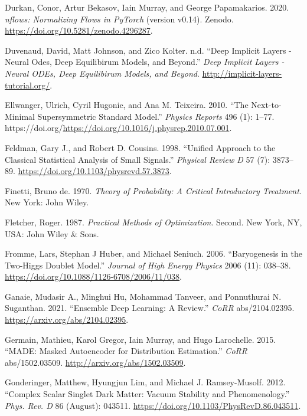 \documentclass[
  11pt,
  numbers=noendperiod]{book}
\newlength{\cslhangindent}
\newlength{\cslentryspacingunit} %
\newenvironment{CSLReferences}[2] %
 {%
  \setlength{\parindent}{0pt}
  \ifodd #1
  \let\oldpar\par
  \def\par{\hangindent=\cslhangindent\oldpar}
  \fi
  \setlength{\parskip}{#2\cslentryspacingunit}
 }%
 {}
\begin{document}
\begin{CSLReferences}{1}{0}
\leavevmode{}%
Durkan, Conor, Artur Bekasov, Iain Murray, and George Papamakarios.
2020. \emph{{nflows}: Normalizing Flows in {PyTorch}} (version v0.14).
Zenodo. \url{https://doi.org/10.5281/zenodo.4296287}.

\leavevmode{}%
Duvenaud, David, Matt Johnson, and Zico Kolter. n.d. {``Deep Implicit
Layers - Neural Odes, Deep Equilibirum Models, and Beyond.''} \emph{Deep
Implicit Layers - Neural ODEs, Deep Equilibirum Models, and Beyond}.
\url{http://implicit-layers-tutorial.org/}.

\leavevmode{}%
Ellwanger, Ulrich, Cyril Hugonie, and Ana M. Teixeira. 2010. {``The
Next-to-Minimal Supersymmetric Standard Model.''} \emph{Physics Reports}
496 (1): 1--77.
https://doi.org/\url{https://doi.org/10.1016/j.physrep.2010.07.001}.

\leavevmode{}%
Feldman, Gary J., and Robert D. Cousins. 1998. {``Unified Approach to
the Classical Statistical Analysis of Small Signals.''} \emph{Physical
Review D} 57 (7): 3873--89.
\url{https://doi.org/10.1103/physrevd.57.3873}.

\leavevmode{}%
Finetti, Bruno de. 1970. \emph{Theory of Probability: A Critical
Introductory Treatment}. New York: John Wiley.

\leavevmode{}%
Fletcher, Roger. 1987. \emph{Practical Methods of Optimization}. Second.
New York, NY, USA: John Wiley \& Sons.

\leavevmode{}%
Fromme, Lars, Stephan J Huber, and Michael Seniuch. 2006.
{``Baryogenesis in the Two-Higgs Doublet Model.''} \emph{Journal of High
Energy Physics} 2006 (11): 038--38.
\url{https://doi.org/10.1088/1126-6708/2006/11/038}.

\leavevmode{}%
Ganaie, Mudasir A., Minghui Hu, Mohammad Tanveer, and Ponnuthurai N.
Suganthan. 2021. {``Ensemble Deep Learning: {A} Review.''} \emph{CoRR}
abs/2104.02395. \url{https://arxiv.org/abs/2104.02395}.

\leavevmode{}%
Germain, Mathieu, Karol Gregor, Iain Murray, and Hugo Larochelle. 2015.
{``{MADE:} Masked Autoencoder for Distribution Estimation.''}
\emph{CoRR} abs/1502.03509. \url{http://arxiv.org/abs/1502.03509}.

\leavevmode{}%
Gonderinger, Matthew, Hyungjun Lim, and Michael J. Ramsey-Musolf. 2012.
{``Complex Scalar Singlet Dark Matter: Vacuum Stability and
Phenomenology.''} \emph{Phys. Rev. D} 86 (August): 043511.
\url{https://doi.org/10.1103/PhysRevD.86.043511}.


\end{CSLReferences}
\end{document}

